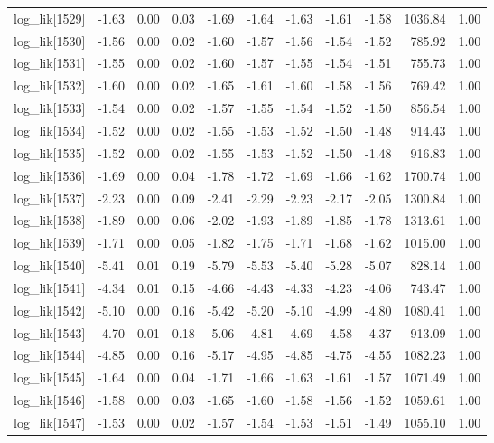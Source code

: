\begin{table}[ht]
\begin{tabular}{rrrrrrrrrrr}
  log\_lik[1529] & -1.63 & 0.00 & 0.03 & -1.69 & -1.64 & -1.63 & -1.61 & -1.58 & 1036.84 & 1.00 \\ 
  log\_lik[1530] & -1.56 & 0.00 & 0.02 & -1.60 & -1.57 & -1.56 & -1.54 & -1.52 & 785.92 & 1.00 \\ 
  log\_lik[1531] & -1.55 & 0.00 & 0.02 & -1.60 & -1.57 & -1.55 & -1.54 & -1.51 & 755.73 & 1.00 \\ 
  log\_lik[1532] & -1.60 & 0.00 & 0.02 & -1.65 & -1.61 & -1.60 & -1.58 & -1.56 & 769.42 & 1.00 \\ 
  log\_lik[1533] & -1.54 & 0.00 & 0.02 & -1.57 & -1.55 & -1.54 & -1.52 & -1.50 & 856.54 & 1.00 \\ 
  log\_lik[1534] & -1.52 & 0.00 & 0.02 & -1.55 & -1.53 & -1.52 & -1.50 & -1.48 & 914.43 & 1.00 \\ 
  log\_lik[1535] & -1.52 & 0.00 & 0.02 & -1.55 & -1.53 & -1.52 & -1.50 & -1.48 & 916.83 & 1.00 \\ 
  log\_lik[1536] & -1.69 & 0.00 & 0.04 & -1.78 & -1.72 & -1.69 & -1.66 & -1.62 & 1700.74 & 1.00 \\ 
  log\_lik[1537] & -2.23 & 0.00 & 0.09 & -2.41 & -2.29 & -2.23 & -2.17 & -2.05 & 1300.84 & 1.00 \\ 
  log\_lik[1538] & -1.89 & 0.00 & 0.06 & -2.02 & -1.93 & -1.89 & -1.85 & -1.78 & 1313.61 & 1.00 \\ 
  log\_lik[1539] & -1.71 & 0.00 & 0.05 & -1.82 & -1.75 & -1.71 & -1.68 & -1.62 & 1015.00 & 1.00 \\ 
  log\_lik[1540] & -5.41 & 0.01 & 0.19 & -5.79 & -5.53 & -5.40 & -5.28 & -5.07 & 828.14 & 1.00 \\ 
  log\_lik[1541] & -4.34 & 0.01 & 0.15 & -4.66 & -4.43 & -4.33 & -4.23 & -4.06 & 743.47 & 1.00 \\ 
  log\_lik[1542] & -5.10 & 0.00 & 0.16 & -5.42 & -5.20 & -5.10 & -4.99 & -4.80 & 1080.41 & 1.00 \\ 
  log\_lik[1543] & -4.70 & 0.01 & 0.18 & -5.06 & -4.81 & -4.69 & -4.58 & -4.37 & 913.09 & 1.00 \\ 
  log\_lik[1544] & -4.85 & 0.00 & 0.16 & -5.17 & -4.95 & -4.85 & -4.75 & -4.55 & 1082.23 & 1.00 \\ 
  log\_lik[1545] & -1.64 & 0.00 & 0.04 & -1.71 & -1.66 & -1.63 & -1.61 & -1.57 & 1071.49 & 1.00 \\ 
  log\_lik[1546] & -1.58 & 0.00 & 0.03 & -1.65 & -1.60 & -1.58 & -1.56 & -1.52 & 1059.61 & 1.00 \\ 
  log\_lik[1547] & -1.53 & 0.00 & 0.02 & -1.57 & -1.54 & -1.53 & -1.51 & -1.49 & 1055.10 & 1.00 \\ 

\end{tabular}
\end{table}
